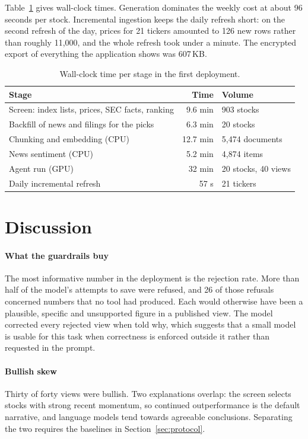 \documentclass[preprint,11pt]{elsarticle}
\begin{document}
Table~\ref{tab:time} gives wall-clock times. Generation dominates the weekly cost at about 96 seconds per
stock. Incremental ingestion keeps the daily refresh short: on the second refresh of the day, prices for 21
tickers amounted to 126 new rows rather than roughly 11{,}000, and the whole refresh took under a minute. The
encrypted export of everything the application shows was 607\,KB.

\begin{table}[t]
\centering\small
\caption{Wall-clock time per stage in the first deployment.}
\label{tab:time}
\begin{tabular}{@{}lrl@{}}
\toprule
Stage & Time & Volume \\
\midrule
Screen: index lists, prices, SEC facts, ranking & 9.6 min & 903 stocks \\
Backfill of news and filings for the picks & 6.3 min & 20 stocks \\
Chunking and embedding (CPU) & 12.7 min & 5{,}474 documents \\
News sentiment (CPU) & 5.2 min & 4{,}874 items \\
Agent run (GPU) & 32 min & 20 stocks, 40 views \\
Daily incremental refresh & 57 s & 21 tickers \\
\bottomrule
\end{tabular}
\end{table}

\section{Discussion}
\label{sec:discussion}

\paragraph{What the guardrails buy} The most informative number in the deployment is the rejection rate.
More than half of the model's attempts to save were refused, and 26 of those refusals concerned numbers that
no tool had produced. Each would otherwise have been a plausible, specific and unsupported figure in a
published view. The model corrected every rejected view when told why, which suggests that a small model is
usable for this task when correctness is enforced outside it rather than requested in the prompt.

\paragraph{Bullish skew} Thirty of forty views were bullish. Two explanations overlap: the screen selects
stocks with strong recent momentum, so continued outperformance is the default narrative, and language models
tend towards agreeable conclusions. Separating the two requires the baselines in Section~\ref{sec:protocol}.
\end{document}
